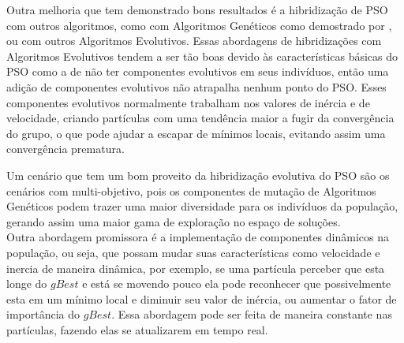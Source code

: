 \indent Outra melhoria que tem demonstrado bons resultados é a hibridização de PSO com outros algoritmos, como com Algoritmos Genéticos como demostrado por \cite{carvalho2014}, ou com outros Algoritmos Evolutivos.
%
Essas abordagens de hibridizações com Algoritmos Evolutivos tendem a ser tão boas devido às características básicas do PSO como a de não ter componentes evolutivos em seus indivíduos, então uma adição de componentes evolutivos não atrapalha nenhum ponto do PSO.
Esses componentes evolutivos normalmente trabalham nos valores de inércia e de velocidade, criando partículas com uma tendência maior a fugir da convergência do grupo, o que pode ajudar a escapar de mínimos locais, evitando assim uma convergência prematura.



Um cenário que tem um bom proveito da hibridização evolutiva do PSO são os cenários com multi-objetivo, pois os componentes de mutação de Algoritmos Genéticos podem trazer uma maior diversidade para os indivíduos da população, gerando assim uma maior gama de exploração no espaço de soluções.\\
\indent Outra abordagem promissora é a implementação de componentes dinâmicos na população, ou seja, que possam mudar suas características como velocidade e inercia de maneira dinâmica, por exemplo, se uma partícula perceber que esta longe do $gBest$ e está se movendo pouco ela pode reconhecer que possivelmente esta em um mínimo local e diminuir seu valor de inércia, ou aumentar o fator de importância do $gBest$.
%
Essa abordagem pode ser feita de maneira constante nas partículas, fazendo elas se atualizarem em tempo real.
